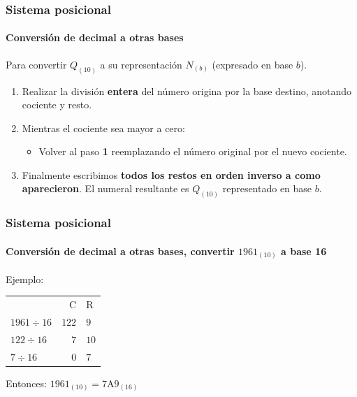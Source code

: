 \documentclass[11pt,a4paper,spanish]{beamer}
\begin{document}
\begin{frame}

\frametitle{Sistema posicional}
\framesubtitle{Conversión de decimal a otras bases}

    Para convertir $Q_{(10)}$ a su representación $N_{(b)}$ (expresado en base
    $b$).
    \begin{enumerate}
    \item Realizar la división \textbf{entera} del número origina por la base
        destino, anotando cociente y resto.
    \item Mientras el cociente sea mayor a cero:
        \begin{itemize}
            \item Volver al paso \textbf{1} reemplazando el número original
                por el nuevo cociente.
        \end{itemize}
    \item Finalmente escribimos \textbf{todos los restos en orden inverso a
        como aparecieron}. El numeral resultante es $Q_{(10)}$ representado en
        base $b$.
    \end{enumerate}

\end{frame}

\begin{frame}

\frametitle{Sistema posicional}
    \framesubtitle{Conversión de decimal a otras bases, convertir
    $1961_{(10)}$ a base 16}

    Ejemplo:
    \pause

    \huge
    \centering
    \begin{tabular}[t]{ l r l}

        & C & R\\

        $1961{\div}16$ & $122$ & $9$\\\pause

        $122{\div}16$ & $7$ & $10$\\\pause

        $7{\div}16$ & $0$ & $7$\\

    \end{tabular}

\pause
Entonces:
    $1961_{(10)} = \mathrm{7A9}_{(16)}$

\end{frame}
\end{document}
